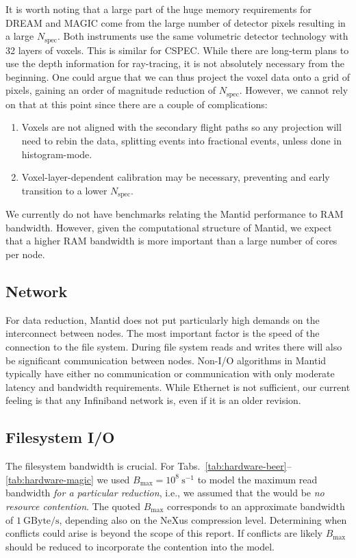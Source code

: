 \documentclass[a4paper,english,numbers=noenddot,bibliography=totoc,chapterprefix=on,DIV=12]{scrartcl}
\newcommand{\Nspec}{N_{\text{spec}}}
\newcommand{\Bmax}{B_{\text{max}}}
\newcommand{\cspec}{CSPEC\xspace}
\newcommand{\dream}{DREAM\xspace}
\newcommand{\magic}{MAGIC\xspace}
\newcommand{\mantid}{Mantid\xspace}
\newcommand{\nexus}{NeXus\xspace}
\begin{document}
It is worth noting that a large part of the huge memory requirements for \dream and \magic come from the large number of detector pixels resulting in a large $\Nspec$.
Both instruments use the same volumetric detector technology with 32 layers of voxels.
This is similar for \cspec.
While there are long-term plans to use the depth information for ray-tracing, it is not absolutely necessary from the beginning.
One could argue that we can thus project the voxel data onto a grid of pixels, gaining an order of magnitude reduction of $\Nspec$.
However, we cannot rely on that at this point since there are a couple of complications:
\begin{enumerate}
  \item Voxels are not aligned with the secondary flight paths so any projection will need to rebin the data, splitting events into fractional events, unless done in histogram-mode.
  \item Voxel-layer-dependent calibration may be necessary, preventing and early transition to a lower $\Nspec$.
\end{enumerate}

We currently do not have benchmarks relating the \mantid performance to RAM bandwidth.
However, given the computational structure of \mantid, we expect that a higher RAM bandwidth is more important than a large number of cores per node.


\subsection{Network}

For data reduction, \mantid does not put particularly high demands on the interconnect between nodes.
The most important factor is the speed of the connection to the file system.
During file system reads and writes there will also be significant communication between nodes.
Non-I/O algorithms in \mantid typically have either no communication or communication with only moderate latency and bandwidth requirements.
While Ethernet is not sufficient, our current feeling is that any Infiniband network is, even if it is an older revision.


\subsection{Filesystem I/O}

The filesystem bandwidth is crucial.
For Tabs.~\ref{tab:hardware-beer}--\ref{tab:hardware-magic} we used $\Bmax = 10^8~\mathrm{s}^{-1}$ to model the maximum read bandwidth \emph{for a particular reduction}, i.e., we assumed that the would be \emph{no resource contention}.
The quoted $\Bmax$ corresponds to an approximate bandwidth of $1~\mathrm{GByte/s}$, depending also on the \nexus compression level.
Determining when conflicts could arise is beyond the scope of this report.
If conflicts are likely $\Bmax$ should be reduced to incorporate the contention into the model.
\end{document}
